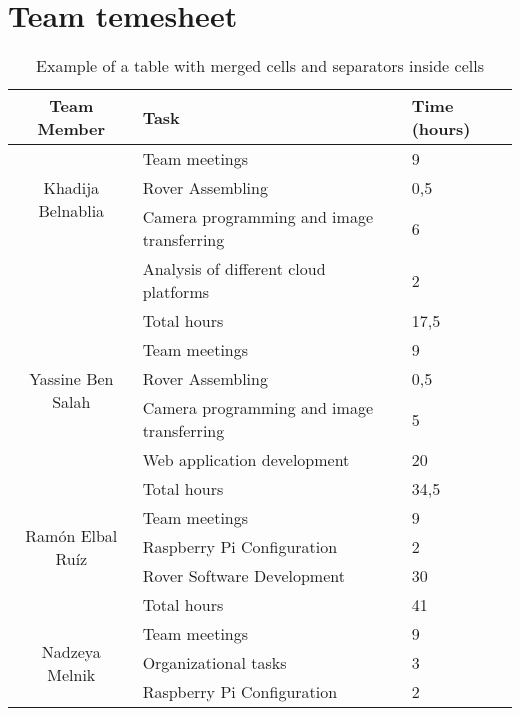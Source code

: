 \chapter{Team temesheet}

\begin{table}[h]
    \centering
    \caption{Example of a table with merged cells and separators inside cells}
    \renewcommand{\arraystretch}{1.3}  %
    \begin{tabular}{|c|p{8cm}|p{2cm}|}
        \hline
        \textbf{Team Member} & \textbf{Task} & \textbf{Time (hours)} \\
        \hline
        \multirow{3}{*}{Khadija Belnablia}  
        & Team meetings  & 9 \\
        \cline{2-3}
        & Rover Assembling   & 0,5 \\
        \cline{2-3}
        & Camera programming and image transferring & 6 \\
         \cline{2-3}
        & Analysis of different cloud platforms & 2 \\
        \cline{2-3}
         & \cellcolor{cyan}Total hours &  \cellcolor{cyan} 17,5  \\
        \hline
        \multirow{3}{*}{Yassine Ben Salah}  
        & Team meetings    & 9 \\
        \cline{2-3}
        & Rover Assembling   & 0,5 \\
         \cline{2-3}
       & Camera programming and image transferring & 5 \\
        \cline{2-3}
        & Web application development & 20 \\
         \cline{2-3}
         & \cellcolor{cyan}Total hours &  \cellcolor{cyan} 34,5  \\
        \hline
        \multirow{3}{*}{Ramón Elbal Ruíz}  
        & Team meetings    & 9 \\
        \cline{2-3}
        & Raspberry Pi Configuration & 2  \\
         \cline{2-3}
         & Rover Software Development  & 30 \\
        \cline{2-3}
         & \cellcolor{cyan}Total hours &  \cellcolor{cyan} 41  \\
        \hline
        \multirow{4}{*}{Nadzeya Melnik}  
         & Team meetings    & 9 \\
        \cline{2-3}
         & Organizational tasks    & 3 \\
        \cline{2-3}
         & Raspberry Pi Configuration & 2  \\

\end{tabular}
\end{table}
